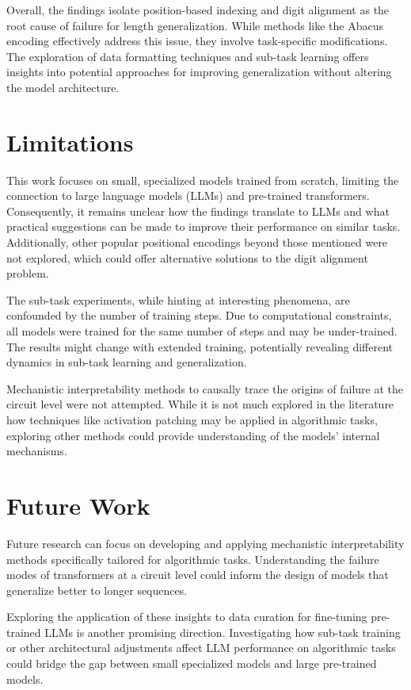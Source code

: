 Overall, the findings isolate position-based indexing and digit alignment as the root cause of failure for length generalization. While methods like the Abacus encoding effectively address this issue, they involve task-specific modifications. The exploration of data formatting techniques and sub-task learning offers insights into potential approaches for improving generalization without altering the model architecture.

\section{Limitations}

This work focuses on small, specialized models trained from scratch, limiting the connection to large language models (LLMs) and pre-trained transformers. Consequently, it remains unclear how the findings translate to LLMs and what practical suggestions can be made to improve their performance on similar tasks. Additionally, other popular positional encodings beyond those mentioned were not explored, which could offer alternative solutions to the digit alignment problem.

The sub-task experiments, while hinting at interesting phenomena, are confounded by the number of training steps. Due to computational constraints, all models were trained for the same number of steps and may be under-trained. The results might change with extended training, potentially revealing different dynamics in sub-task learning and generalization.

Mechanistic interpretability methods to causally trace the origins of failure at the circuit level were not attempted. While it is not much explored in the literature how techniques like activation patching may be applied in algorithmic tasks, exploring other methods could provide understanding of the models' internal mechanisms.

\section{Future Work}

Future research can focus on developing and applying mechanistic interpretability methods specifically tailored for algorithmic tasks. Understanding the failure modes of transformers at a circuit level could inform the design of models that generalize better to longer sequences.

Exploring the application of these insights to data curation for fine-tuning pre-trained LLMs is another promising direction. Investigating how sub-task training or other architectural adjustments affect LLM performance on algorithmic tasks could bridge the gap between small specialized models and large pre-trained models.

